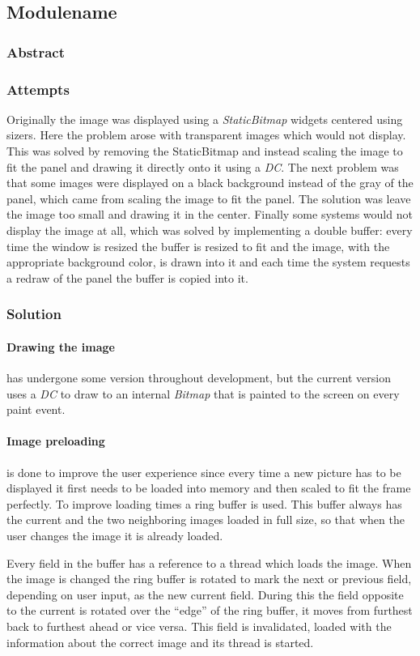 \subsection{Modulename}
\def\kapitelautor{}

\subsubsection{Abstract}

\subsubsection{Attempts}

Originally the image was displayed using a \emph{StaticBitmap} widgets centered
using sizers. Here the problem arose with transparent images which would not
display. This was solved by removing the StaticBitmap and instead scaling the
image to fit the panel and drawing it directly onto it using a \emph{DC}. The
next problem was that some images were displayed on a black background instead
of the gray of the panel, which came from scaling the image to fit the panel.
The solution was leave the image too small and drawing it in the center. Finally
some systems would not display the image at all, which was solved by
implementing a double buffer: every time the window is resized the buffer is
resized to fit and the image, with the appropriate background color, is drawn
into it and each time the system requests a redraw of the panel the buffer is
copied into it.

\subsubsection{Solution} %

\paragraph{Drawing the image} has undergone some version throughout development,
but the current version uses a \emph{DC} to draw to an internal \emph{Bitmap}
that is painted to the screen on every paint event.

\paragraph{Image preloading} is done to improve the user experience since every
time a new picture has to be displayed it first needs to be loaded into memory
and then scaled to fit the frame perfectly. To improve loading times a ring
buffer is used. This buffer always has the current and the two neighboring
images loaded in full size, so that when the user changes the image it is
already loaded.

Every field in the buffer has a reference to a thread which loads the image.
When the image is changed the ring buffer is rotated to mark the next or
previous field, depending on user input, as the new current field. During this
the field opposite to the current is rotated over the ``edge'' of the ring
buffer, it moves from furthest back to furthest ahead or vice versa. This field
is invalidated, loaded with the information about the correct image and its
thread is started.
